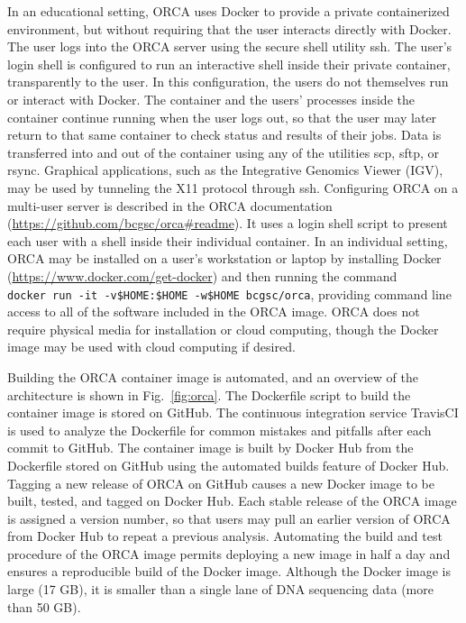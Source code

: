 \documentclass{bioinfo}
\begin{document}
In an educational setting, ORCA uses Docker to provide a private containerized environment, but without requiring that the user interacts directly with Docker. The user logs into the ORCA server using the secure shell utility ssh. The user's login shell is configured to run an interactive shell inside their private container, transparently to the user. In this configuration, the users do not themselves run or interact with Docker. The container and the users' processes inside the container continue running when the user logs out, so that the user may later return to that same container to check status and results of their jobs. Data is transferred into and out of the container using any of the utilities scp, sftp, or rsync. Graphical applications, such as the Integrative Genomics Viewer (IGV), may be used by tunneling the X11 protocol through ssh. Configuring ORCA on a multi-user server is described in the ORCA documentation (\url{https://github.com/bcgsc/orca\#readme}). It uses a login shell script to present each user with a shell inside their individual container. In an individual setting, ORCA may be installed on a user's workstation or laptop by installing Docker (\url{https://www.docker.com/get-docker}) and then running the command \texttt{docker\ run\ -it\ -v\$HOME:\$HOME\ -w\$HOME\ bcgsc/orca}, providing command line access to all of the software included in the ORCA image. ORCA does not require physical media for installation or cloud computing, though the Docker image may be used with cloud computing if desired.

Building the ORCA container image is automated, and an overview of the architecture is shown in Fig.~\ref{fig:orca}. The Dockerfile script to build the container image is stored on GitHub. The continuous integration service TravisCI is used to analyze the Dockerfile for common mistakes and pitfalls after each commit to GitHub. The container image is built by Docker Hub from the Dockerfile stored on GitHub using the automated builds feature of Docker Hub. Tagging a new release of ORCA on GitHub causes a new Docker image to be built, tested, and tagged on Docker Hub. Each stable release of the ORCA image is assigned a version number, so that users may pull an earlier version of ORCA from Docker Hub to repeat a previous analysis. Automating the build and test procedure of the ORCA image permits deploying a new image in half a day and ensures a reproducible build of the Docker image. Although the Docker image is large (17 GB), it is smaller than a single lane of DNA sequencing data (more than 50 GB).
\end{document}
